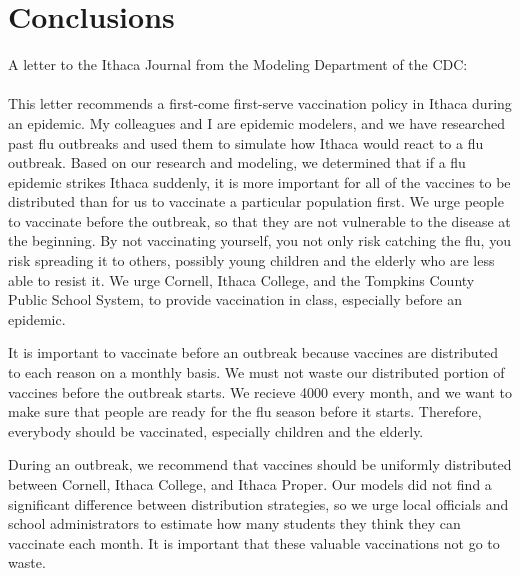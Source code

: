 \documentclass[titlepage]{article}
\begin{document}
\section{Conclusions}

A letter to the Ithaca Journal from the Modeling Department of the CDC:

\paragraph{}
This letter recommends a first-come first-serve
	vaccination policy in Ithaca during an epidemic.
My colleagues and I are epidemic modelers, and we have researched
	past flu outbreaks and used them to simulate how Ithaca
	would react to a flu outbreak.
Based on our research and modeling, we determined that if a
	flu epidemic strikes Ithaca suddenly, it is more important
	for all of the vaccines to be distributed than for us to
	vaccinate a particular population first.
We urge people to vaccinate before the outbreak, so that they are not
	vulnerable to the disease at the beginning.
By not vaccinating yourself, you not only risk catching the flu,
	you risk spreading it to others, possibly young children and the
	elderly who are less able to resist it.
We urge Cornell, Ithaca College, and the Tompkins County Public School
	System, to provide vaccination in class, especially before an epidemic.

It is important to vaccinate before an outbreak because vaccines are
	distributed to each reason on a monthly basis.
We must not waste our distributed portion of vaccines before the outbreak
	starts.
We recieve 4000 every month, and we want to make sure that people are
	ready for the flu season before it starts.
Therefore, everybody should be vaccinated, especially children and the elderly.

During an outbreak, we recommend that vaccines should be uniformly distributed
	between Cornell, Ithaca College, and Ithaca Proper.
Our models did not find a significant difference between distribution strategies,
	so we urge local officials and school administrators to estimate how
	many students they think they can vaccinate each month.
It is important that these valuable vaccinations not go to waste.
\end{document}
